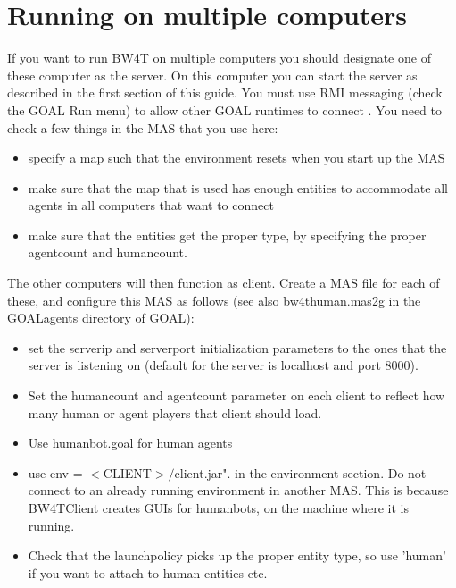 \documentclass[11pt,a4paper]{article}
\begin{document}
\section{Running on multiple computers}
If you want to run BW4T on multiple computers you should designate one of these computer as the server. On this computer you can start the server as described in the first section of this guide. You must use RMI messaging (check the GOAL Run menu) to allow other GOAL runtimes to connect .
You need to check a few things in the MAS that you use here:
\begin{itemize}
\item specify a map such that the environment resets when you start up the MAS
\item make sure that the map that is used has enough entities to accommodate all agents in all computers that want to connect
\item make sure that the entities get the proper type, by specifying the proper agentcount and humancount.
\end{itemize}
The other computers will then function as client. Create a MAS file for each of these, and configure this MAS as follows (see also bw4thuman.mas2g in the GOALagents directory of GOAL):
\begin{itemize}
\item set the serverip and serverport initialization parameters to the ones that the server is listening on (default for the server is localhost and port 8000).
\item Set the humancount and agentcount parameter on each client to reflect how many human or agent players that client should load.
\item Use humanbot.goal for human agents
\item use env = $<$CLIENT$>/$client.jar". in the environment section. Do not connect to an already running environment in another MAS. This is because BW4TClient creates GUIs for humanbots, on the machine where it is running.
\item Check that the launchpolicy picks up the proper entity type, so use 'human' if you want to attach to human entities etc.
\end{itemize} 
\end{document}
